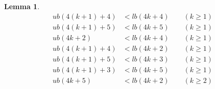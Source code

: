 \documentclass[12pt]{article}
\newtheorem{lem}[defin]{Lemma}
\newenvironment{lemma}{\begin{lem} \sl}{\end{lem}}
\begin{document}
\begin{lemma}
\begin{align}
    \label{4k+4 monotonic}
    ub(4(k+1)+4) &< lb(4k+4) \qquad (k \geq 1) \\
    \label{4k+5 monotonic}
    ub(4(k+1)+5) &< lb(4k+5) \qquad (k \geq 1) \\
    ub(4k+2) &< lb(4k+4) \qquad (k \geq 1) \\
    \label{4k+4 < 4(k-1)+2}
    ub(4(k+1)+4) &< lb(4k+2) \qquad (k \geq 1) \\
    ub(4(k+1)+5) &< lb(4k+3) \qquad (k \geq 1) \\
    ub(4(k+1)+3) &< lb(4k+5) \qquad (k \geq 1) \\
    ub(4k+5) &< lb(4k+2) \qquad (k \geq 2)
  \end{align}
\end{lemma}

\setcounter{equation}{2}
\renewcommand{\theequation}{\arabic{equation}}
\end{document}
